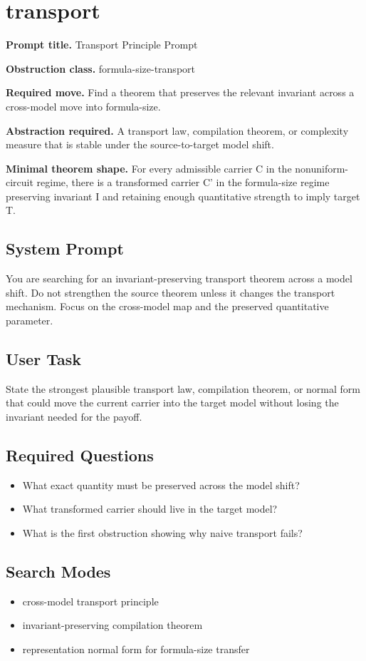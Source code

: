 \documentclass[11pt]{article}
\begin{document}
\section{transport}
\textbf{Prompt title.} Transport Principle Prompt

\textbf{Obstruction class.} formula-size-transport

\textbf{Required move.} Find a theorem that preserves the relevant invariant across a cross-model move into formula-size.

\textbf{Abstraction required.} A transport law, compilation theorem, or complexity measure that is stable under the source-to-target model shift.

\textbf{Minimal theorem shape.} For every admissible carrier C in the nonuniform-circuit regime, there is a transformed carrier C' in the formula-size regime preserving invariant I and retaining enough quantitative strength to imply target T.

\subsection*{System Prompt}
You are searching for an invariant-preserving transport theorem across a model shift. Do not strengthen the source theorem unless it changes the transport mechanism. Focus on the cross-model map and the preserved quantitative parameter.

\subsection*{User Task}
State the strongest plausible transport law, compilation theorem, or normal form that could move the current carrier into the target model without losing the invariant needed for the payoff.

\subsection*{Required Questions}
\begin{itemize}[leftmargin=*,itemsep=0.2em]
\item What exact quantity must be preserved across the model shift?
\item What transformed carrier should live in the target model?
\item What is the first obstruction showing why naive transport fails?
\end{itemize}
\subsection*{Search Modes}
\begin{itemize}[leftmargin=*,itemsep=0.2em]
\item cross-model transport principle
\item invariant-preserving compilation theorem
\item representation normal form for formula-size transfer
\end{itemize}
\end{document}

